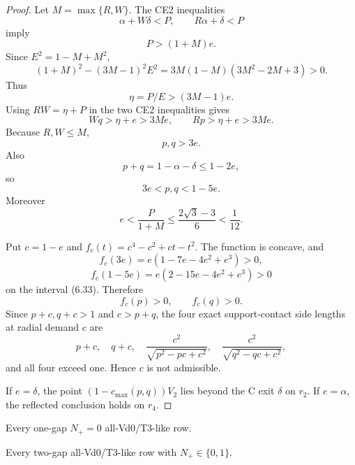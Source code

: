 

\begin{proof}
Let $M=\max\{R,W\}$.  The CE2 inequalities
\[
 \alpha+W\delta<P,\qquad R\alpha+\delta<P
\]
imply
\[
 P>(1+M)e.
 \tag{6.31}
\]
Since $E^2=1-M+M^2$,
\[
 (1+M)^2-(3M-1)^2E^2
 =
 3M(1-M)(3M^2-2M+3)>0.
\]
Thus
\[
 \eta=P/E>(3M-1)e.
\]
Using $RW=\eta+P$ in the two CE2 inequalities gives
\[
 Wq>\eta+e>3Me,\qquad Rp>\eta+e>3Me.
\]
Because $R,W\le M$,
\[
 p,q>3e.
\]
Also
\[
 p+q=1-\alpha-\delta\le1-2e,
\]
so
\[
 \boxed{3e<p,q<1-5e.}
 \tag{6.32}
\]
Moreover
\[
 e<\frac{P}{1+M}
 \le\frac{2\sqrt3-3}{6}<\frac1{12}.
 \tag{6.33}
\]

Put $c=1-e$ and $f_c(t)=c^4-c^2+ct-t^2$.  The function is concave, and
\[
 f_c(3e)=e(1-7e-4e^2+e^3)>0,
\]
\[
 f_c(1-5e)=e(2-15e-4e^2+e^3)>0
\]
on the interval (6.33).  Therefore
\[
 f_c(p)>0,\qquad f_c(q)>0.
 \tag{6.34}
\]
Since $p+c,q+c>1$ and $c>p+q$, the four exact support-contact side lengths at
radial demand $c$ are
\[
 p+c,\quad q+c,\quad
 \frac{c^2}{\sqrt{p^2-pc+c^2}},\quad
 \frac{c^2}{\sqrt{q^2-qc+c^2}},
\]
and all four exceed one.  Hence $c$ is not admissible.

If $e=\delta$, the point $(1-c_{\max}(p,q))V_2$ lies beyond the C exit
$\delta$ on $r_2$.  If $e=\alpha$, the reflected conclusion holds on $r_4$.
\end{proof}

{Every one-gap $N_+=0$ all-Vd0/T3-like row.}

{Every two-gap all-Vd0/T3-like row with $N_+\in\{0,1\}$.}

